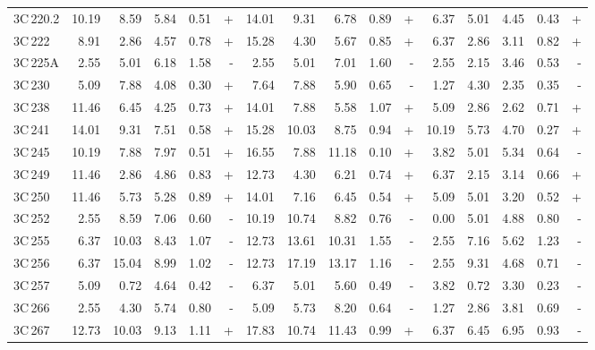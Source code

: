 \documentclass[mathleft,fleqn,%
]{an}
\begin{document}
\begin{table*}
\begin{tabular}{l|rrrrr|rrrrr|rrrrr}
   3C\,220.2 &  10.19 &   8.59 &   5.84 &   0.51 & +  &  14.01 &   9.31 &   6.78 &   0.89 & +  &   6.37 &   5.01 &   4.45 &   0.43 & +   \\
     3C\,222 &   8.91 &   2.86 &   4.57 &   0.78 & +  &  15.28 &   4.30 &   5.67 &   0.85 & +  &   6.37 &   2.86 &   3.11 &   0.82 & +   \\
    3C\,225A &   2.55 &   5.01 &   6.18 &   1.58 & -  &   2.55 &   5.01 &   7.01 &   1.60 & -  &   2.55 &   2.15 &   3.46 &   0.53 & -   \\
     3C\,230 &   5.09 &   7.88 &   4.08 &   0.30 & +  &   7.64 &   7.88 &   5.90 &   0.65 & -  &   1.27 &   4.30 &   2.35 &   0.35 & -   \\
     3C\,238 &  11.46 &   6.45 &   4.25 &   0.73 & +  &  14.01 &   7.88 &   5.58 &   1.07 & +  &   5.09 &   2.86 &   2.62 &   0.71 & +   \\
     3C\,241 &  14.01 &   9.31 &   7.51 &   0.58 & +  &  15.28 &  10.03 &   8.75 &   0.94 & +  &  10.19 &   5.73 &   4.70 &   0.27 & +   \\
     3C\,245 &  10.19 &   7.88 &   7.97 &   0.51 & +  &  16.55 &   7.88 &  11.18 &   0.10 & +  &   3.82 &   5.01 &   5.34 &   0.64 & -   \\
     3C\,249 &  11.46 &   2.86 &   4.86 &   0.83 & +  &  12.73 &   4.30 &   6.21 &   0.74 & +  &   6.37 &   2.15 &   3.14 &   0.66 & +   \\
     3C\,250 &  11.46 &   5.73 &   5.28 &   0.89 & +  &  14.01 &   7.16 &   6.45 &   0.54 & +  &   5.09 &   5.01 &   3.20 &   0.52 & +   \\
     3C\,252 &   2.55 &   8.59 &   7.06 &   0.60 & -  &  10.19 &  10.74 &   8.82 &   0.76 & -  &   0.00 &   5.01 &   4.88 &   0.80 & -   \\
     3C\,255 &   6.37 &  10.03 &   8.43 &   1.07 & -  &  12.73 &  13.61 &  10.31 &   1.55 & -  &   2.55 &   7.16 &   5.62 &   1.23 & -   \\
     3C\,256 &   6.37 &  15.04 &   8.99 &   1.02 & -  &  12.73 &  17.19 &  13.17 &   1.16 & -  &   2.55 &   9.31 &   4.68 &   0.71 & -   \\
     3C\,257 &   5.09 &   0.72 &   4.64 &   0.42 & -  &   6.37 &   5.01 &   5.60 &   0.49 & -  &   3.82 &   0.72 &   3.30 &   0.23 & -   \\
     3C\,266 &   2.55 &   4.30 &   5.74 &   0.80 & -  &   5.09 &   5.73 &   8.20 &   0.64 & -  &   1.27 &   2.86 &   3.81 &   0.69 & -   \\
     3C\,267 &  12.73 &  10.03 &   9.13 &   1.11 & +  &  17.83 &  10.74 &  11.43 &   0.99 & +  &   6.37 &   6.45 &   6.95 &   0.93 & -   \\

\end{tabular}
\end{table*}
\end{document}
